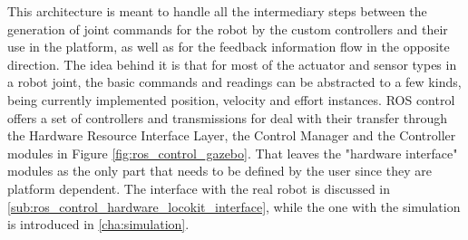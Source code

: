 This architecture is meant to handle all the intermediary steps between the generation of joint commands for the robot by the custom controllers and their use in the platform, as well as for the feedback information flow in the opposite direction.
The idea behind it is that for most of the actuator and sensor types in a robot joint, the basic commands and readings can be abstracted to a few kinds, being currently implemented position, velocity and effort instances.
ROS control offers a set of controllers and transmissions for deal with their transfer through the Hardware Resource Interface Layer, the Control Manager and the Controller modules in Figure \ref{fig:ros_control_gazebo}.
That leaves the "hardware interface" modules as the only part that needs to be defined by the user since they are platform dependent.
The interface with the real robot is discussed in \ref{sub:ros_control_hardware_locokit_interface}, while the one with the simulation is introduced in \ref{cha:simulation}.


